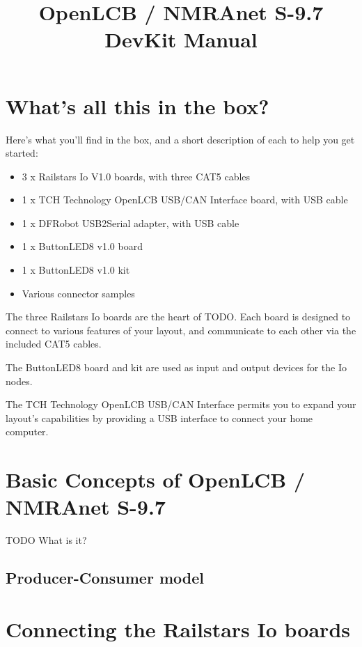 \documentclass[12pt]{book}
\title{OpenLCB / NMRAnet S-9.7 DevKit Manual}
\begin{document}
\maketitle

\tableofcontents

\chapter{What's all this in the box?}

Here's what you'll find in the box, and a short description of each to help you get started:
\begin{itemize}
\item 3 x Railstars Io V1.0 boards, with three CAT5 cables
\item 1 x TCH Technology OpenLCB USB/CAN Interface board, with USB cable
\item 1 x DFRobot USB2Serial adapter, with USB cable
\item 1 x ButtonLED8 v1.0 board
\item 1 x ButtonLED8 v1.0 kit
\item Various connector samples
\end{itemize}

The three Railstars Io boards are the heart of TODO. Each board is designed to connect to various features of your layout, and communicate to each other via the included CAT5 cables.

The ButtonLED8 board and kit are used as input and output devices for the Io nodes.  

The TCH Technology OpenLCB USB/CAN Interface permits you to expand your layout's capabilities by providing a USB interface to connect your home computer.

\chapter{Basic Concepts of OpenLCB / NMRAnet S-9.7}

TODO What is it?

\section{Producer-Consumer model}

\chapter{Connecting the Railstars Io boards}
\end{document}
